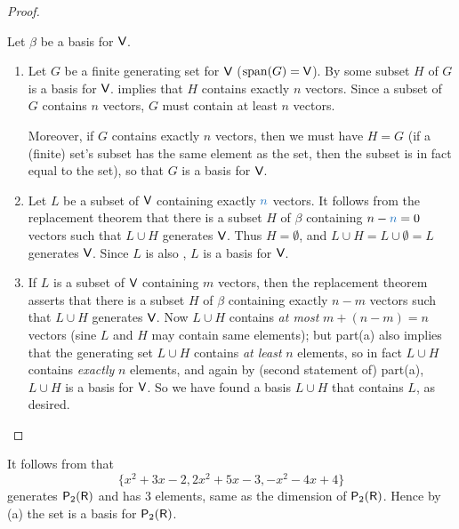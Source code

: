 \begin{proof}\ 

Let \(\beta\) be a basis for \(\textsf{V}\).
\begin{enumerate}
\item Let \(G\) be a finite generating set for \(\textsf{V}\) (\(\operatorname{span}(G) = \textsf{V}\)).
    By  some subset \(H\) of \(G\) is a basis for \(\textsf{V}\).  implies that \(H\) contains exactly \(n\) vectors.
    Since a subset of \(G\) contains \(n\) vectors, \(G\) must contain at least \(n\) vectors.
    
    Moreover, if \(G\) contains exactly \(n\) vectors, then we must have \(H = G\) (if a (finite) set's subset has the same element as the set, then the subset is in fact equal to the set), so that \(G\) is a basis for \(\textsf{V}\).
\item Let \(L\) be a \LID{} subset of \(\textsf{V}\) containing exactly \(\BLUE{n}\) vectors.
    It follows from the replacement theorem  that there is a subset \(H\) of \(\beta\) containing \(n - \BLUE{n} = 0\) vectors such that \(L \cup H\) generates \(\textsf{V}\).
    Thus \(H = \emptyset\), and \(L \cup H = L \cup \emptyset = L\) generates \(\textsf{V}\). Since \(L\) is also \LID{}, \(L\) is a basis for \(\textsf{V}\).
\item If \(L\) is a \LID{} subset of \(\textsf{V}\) containing \(m\) vectors, then the replacement theorem  asserts that there is a subset \(H\) of \(\beta\) containing exactly \(n - m\) vectors such that \(L \cup H\) generates \(\textsf{V}\).
    Now \(L \cup H\) contains \emph{at most} \(m + (n - m) = n\) vectors (sine \(L\) and \(H\) may contain same elements);
    but part(a) also implies that the generating set \(L \cup H\) contains \emph{at least} \(n\) elements, so in fact \(L \cup H\) contains \emph{exactly} \(n\) elements, and again by (second statement of) part(a), \(L \cup H\) is a basis for \(\textsf{V}\).
    So we have found a basis \(L \cup H\) that contains \(L\), as desired.
\end{enumerate}
\end{proof}

\begin{example} \label{1.6.14}
It follows from  that
\[
    \{ x^2 + 3x - 2, 2x^2 + 5x - 3, -x^2 -4x + 4 \}
\]
generates \(\textsf{P}_2(\textsf{R})\) and has \(3\) elements, same as the dimension of \(\textsf{P}_2(\textsf{R})\).
Hence by (a) the set is a basis for \(\textsf{P}_2(\textsf{R})\).
\end{example}

